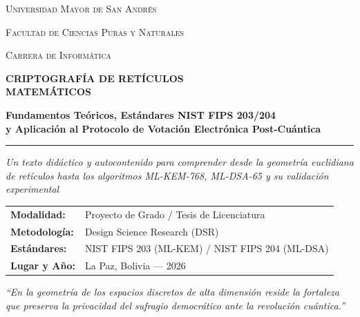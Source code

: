 \documentclass[11pt,a4paper,twoside,openright]{book}
\theoremstyle{plain}
\theoremstyle{definition}
\theoremstyle{remark}
\newcommand{\MLKEM}{\textsf{ML-KEM}}
\newcommand{\MLDSA}{\textsf{ML-DSA}}
\begin{document}

\hypersetup{pageanchor=false}

\begin{titlepage}
\centering
\vspace*{0.5cm}

{\scshape\Large Universidad Mayor de San Andr\'es\par}
{\scshape\large Facultad de Ciencias Puras y Naturales\par}
{\scshape\normalsize Carrera de Inform\'atica\par}

\vspace{0.8cm}
\begin{center}
\end{center}

\vspace{0.6cm}
{\huge\bfseries\color{PQCBlue}
  CRIPTOGRAF\'IA DE RET\'ICULOS\\[0.3em]
  MATEM\'ATICOS
\par}
\vspace{0.4cm}
{\Large\bfseries\color{PQCCyan}
  Fundamentos Te\'oricos, Est\'andares NIST FIPS 203/204\\[0.2em]
  y Aplicaci\'on al Protocolo de Votaci\'on Electr\'onica Post-Cu\'antica
\par}

\vspace{0.6cm}
\rule{\linewidth}{0.6mm}
\vspace{0.5cm}

{\large\itshape
  Un texto did\'actico y autocontenido para comprender desde la geometr\'ia euclidiana\\
  de ret\'iculos hasta los algoritmos \MLKEM{}-768, \MLDSA{}-65 y su validaci\'on experimental
\par}

\vspace{1.0cm}
\begin{tabular}{ll}
  \textbf{Modalidad:} & Proyecto de Grado / Tesis de Licenciatura \\
  \textbf{Metodolog\'ia:} & Design Science Research (DSR) \\
  \textbf{Est\'andares:} & NIST FIPS 203 (\MLKEM{}) / NIST FIPS 204 (\MLDSA{}) \\
  \textbf{Lugar y A\~no:} & La Paz, Bolivia --- 2026 \\
\end{tabular}

\vfill
{\small\color{PQCGray}
  \textit{``En la geometr\'ia de los espacios discretos de alta dimensi\'on reside la fortaleza\\
  que preserva la privacidad del sufragio democr\'atico ante la revoluci\'on cu\'antica.''}
}
\end{titlepage}
\end{document}
